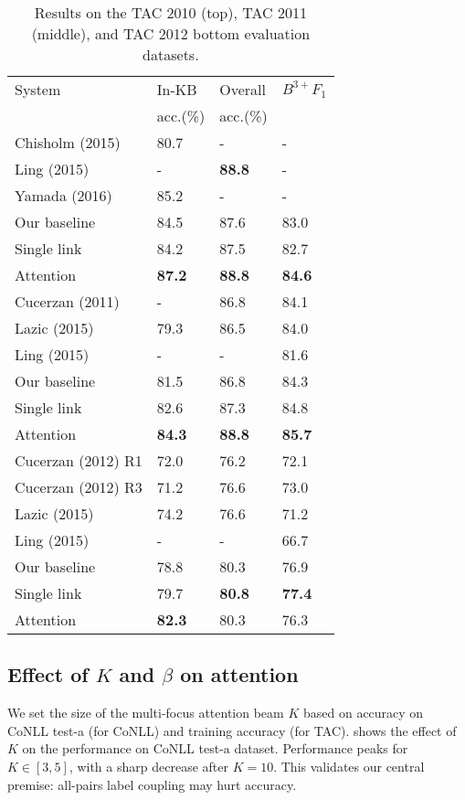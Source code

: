 \begin{table}[t!]
\centering
\begin{tabular}{l|l|l|l}
 System & In-KB & Overall & {\small ${B^{3+}F_1}$} \\ 
 & acc.(\%) & acc.(\%) & \\
\hline
\hline
Chisholm (2015) & 80.7& - & - \\
Ling (2015) & - & {\bf 88.8} & - \\
Yamada (2016)&  85.2 & - & - \\
  Our baseline & 84.5 & 87.6 & 83.0 \\
 Single link & 84.2 & 87.5 & 82.7\\
 Attention & {\bf 87.2} & {\bf 88.8} & {\bf 84.6} \\
\hline \hline
Cucerzan (2011) & - & 86.8 &  84.1 \\
Lazic (2015) & 79.3 & 86.5 & 84.0 \\
Ling (2015) &- & - & 81.6 \\
Our baseline & 81.5 & 86.8 & 84.3 \\
Single link & 82.6 & 87.3 & 84.8 \\
 Attention & {\bf 84.3} & {\bf 88.8} & {\bf 85.7} \\
\hline
\hline
Cucerzan (2012) R1 & 72.0 & 76.2 & 72.1  \\
Cucerzan (2012) R3 & 71.2 & 76.6 & 73.0 \\
Lazic (2015) & {74.2} & {76.6} & 71.2 \\
Ling (2015) & - & - & 66.7 \\
Our baseline &78.8 & 80.3 & 76.9\\
 Single link & 79.7 & {\bf 80.8} & {\bf 77.4}  \\
 Attention &{\bf 82.3} & 80.3 & 76.3 \\ \hline
\end{tabular}
\caption{Results on the TAC 2010 (top), TAC 2011 (middle), and TAC 2012 bottom evaluation datasets. \label{table:tac_results} }
\end{table}


\subsection{Effect of $K$ and $\beta$ on attention}

We set the size of the multi-focus attention beam $K$ based on accuracy on
CoNLL test-a (for CoNLL) and training accuracy (for TAC). 
 shows the effect of $K$ on the performance on 
CoNLL test-a dataset. 
Performance peaks for $K \in [3,5]$, with a sharp decrease after
$K=10$.  This validates our central premise: all-pairs label coupling
may hurt accuracy.

